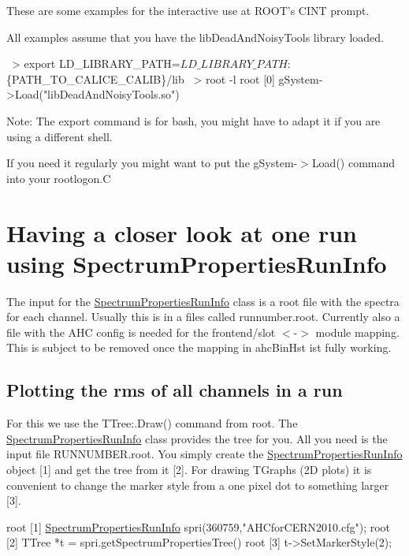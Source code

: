 These are some examples for the interactive use at R\-O\-O\-T's C\-I\-N\-T prompt.

All examples assume that you have the lib\-Dead\-And\-Noisy\-Tools library loaded. 
\begin{DoxyCode}
~> export LD\_LIBRARY\_PATH=$LD\_LIBRARY\_PATH:$\{PATH\_TO\_CALICE\_CALIB\}/lib
~> root -l
root [0] gSystem->Load(\textcolor{stringliteral}{"libDeadAndNoisyTools.so"})
\end{DoxyCode}


Note\-: The {\ttfamily export} command is for bash, you might have to adapt it if you are using a different shell.

If you need it regularly you might want to put the {\ttfamily g\-System-\/$>$Load()} command into your rootlogon.\-C\hypertarget{_examples_usingSpectrumPropertiesRunInfo}{}\section{Having a closer look at one run using Spectrum\-Properties\-Run\-Info}\label{_examples_usingSpectrumPropertiesRunInfo}
The input for the \hyperlink{class_spectrum_properties_run_info}{Spectrum\-Properties\-Run\-Info} class is a root file with the spectra for each channel. Usually this is in a files called {\ttfamily runnumber.\-root}. Currently also a file with the A\-H\-C config is needed for the frontend/slot $<$-\/$>$ module mapping. This is subject to be removed once the mapping in ahc\-Bin\-Hst ist fully working.\hypertarget{_examples_plotRun}{}\subsection{Plotting the rms of all channels in a run}\label{_examples_plotRun}
For this we use the T\-Tree\-:.Draw() command from root. The \hyperlink{class_spectrum_properties_run_info}{Spectrum\-Properties\-Run\-Info} class provides the tree for you. All you need is the input file {\ttfamily R\-U\-N\-N\-U\-M\-B\-E\-R.\-root}. You simply create the \hyperlink{class_spectrum_properties_run_info}{Spectrum\-Properties\-Run\-Info} object \mbox{[}1\mbox{]} and get the tree from it \mbox{[}2\mbox{]}. For drawing T\-Graphs (2\-D plots) it is convenient to change the marker style from a one pixel dot to something larger \mbox{[}3\mbox{]}. 
\begin{DoxyCode}
root [1] \hyperlink{class_spectrum_properties_run_info}{SpectrumPropertiesRunInfo} spri(360759,\textcolor{stringliteral}{"AHCforCERN2010.cfg"});
root [2] TTree *t = spri.getSpectrumPropertiesTree()
root [3] t->SetMarkerStyle(2);
\end{DoxyCode}


